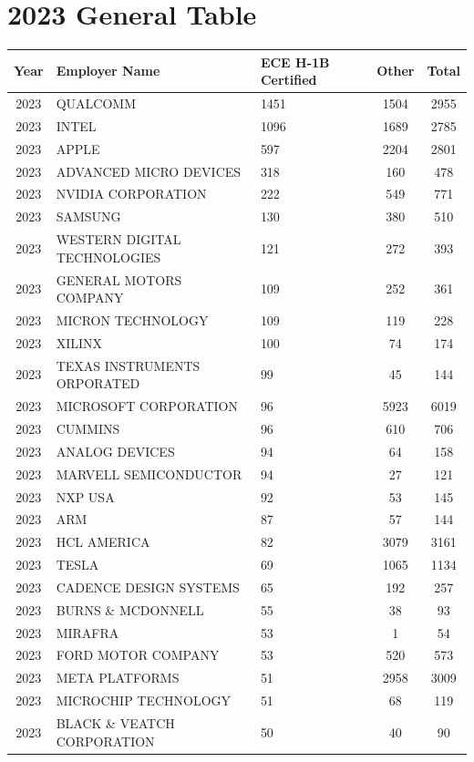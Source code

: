 \documentclass{article}%
\begin{document}
\section{2023 General Table}%
\label{sec:2023GeneralTable}%
\begin{longtable}{c|p{20em}|p{5em}|c|c}%
\hline%
Year&Employer Name&ECE \newline%
 H{-}1B \newline%
 Certified&Other&Total\\%
\hline%
2023&QUALCOMM&1451&1504&2955\\%
\hline%
2023&INTEL&1096&1689&2785\\%
\hline%
2023&APPLE&597&2204&2801\\%
\hline%
2023&ADVANCED MICRO DEVICES&318&160&478\\%
\hline%
2023&NVIDIA CORPORATION&222&549&771\\%
\hline%
2023&SAMSUNG&130&380&510\\%
\hline%
2023&WESTERN DIGITAL TECHNOLOGIES&121&272&393\\%
\hline%
2023&GENERAL MOTORS COMPANY&109&252&361\\%
\hline%
2023&MICRON TECHNOLOGY&109&119&228\\%
\hline%
2023&XILINX&100&74&174\\%
\hline%
2023&TEXAS INSTRUMENTS ORPORATED&99&45&144\\%
\hline%
2023&MICROSOFT CORPORATION&96&5923&6019\\%
\hline%
2023&CUMMINS&96&610&706\\%
\hline%
2023&ANALOG DEVICES&94&64&158\\%
\hline%
2023&MARVELL SEMICONDUCTOR&94&27&121\\%
\hline%
2023&NXP USA&92&53&145\\%
\hline%
2023&ARM&87&57&144\\%
\hline%
2023&HCL AMERICA&82&3079&3161\\%
\hline%
2023&TESLA&69&1065&1134\\%
\hline%
2023&CADENCE DESIGN SYSTEMS&65&192&257\\%
\hline%
2023&BURNS \& MCDONNELL&55&38&93\\%
\hline%
2023&MIRAFRA&53&1&54\\%
\hline%
2023&FORD MOTOR COMPANY&53&520&573\\%
\hline%
2023&META PLATFORMS&51&2958&3009\\%
\hline%
2023&MICROCHIP TECHNOLOGY&51&68&119\\%
\hline%
2023&BLACK \& VEATCH CORPORATION&50&40&90\\%

\end{longtable}
\end{document}
